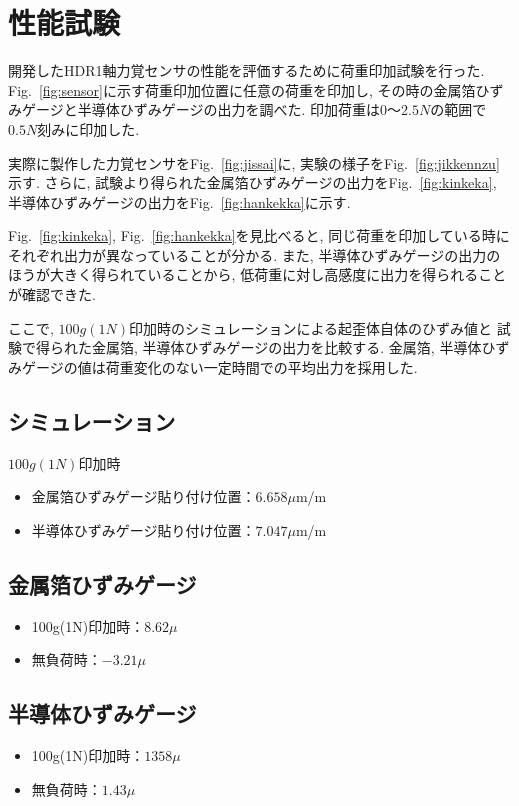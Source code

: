 \section{性能試験}
開発したHDR1軸力覚センサの性能を評価するために荷重印加試験を行った.
Fig.~\ref{fig:sensor}に示す荷重印加位置に任意の荷重を印加し, 
その時の金属箔ひずみゲージと半導体ひずみゲージの出力を調べた. 
印加荷重は$0～2.5N$の範囲で$0.5N$刻みに印加した.

実際に製作した力覚センサをFig.~\ref{fig:jissai}に, 
実験の様子をFig.~\ref{fig:jikkennzu}示す.
さらに, 試験より得られた金属箔ひずみゲージの出力をFig.~\ref{fig:kinkeka}, 
半導体ひずみゲージの出力をFig.~\ref{fig:hankekka}に示す. 

Fig.~\ref{fig:kinkeka}, Fig.~\ref{fig:hankekka}を見比べると, 
同じ荷重を印加している時にそれぞれ出力が異なっていることが分かる. 
また, 半導体ひずみゲージの出力のほうが大きく得られていることから, 
低荷重に対し高感度に出力を得られることが確認できた. 

ここで, $100g(1N)$印加時のシミュレーションによる起歪体自体のひずみ値と 
試験で得られた金属箔, 半導体ひずみゲージの出力を比較する. 
金属箔, 半導体ひずみゲージの値は荷重変化のない一定時間での平均出力を採用した. 
\vspace{0.3cm}
\subsection*{シミュレーション}
$100g(1N)$印加時
\begin{itemize}
  \item 金属箔ひずみゲージ貼り付け位置：$6.658\mu$m/m
  \item 半導体ひずみゲージ貼り付け位置：$7.047\mu$m/m
\end{itemize}
\vspace{0.3cm}
\subsection*{金属箔ひずみゲージ}
\begin{itemize}
  \item 100g(1N)印加時：$8.62\mu$
  \item 無負荷時：$-3.21\mu$
\end{itemize}
\vspace{0.3cm}
\subsection*{半導体ひずみゲージ}
\begin{itemize}
  \item 100g(1N)印加時：$1358\mu$
  \item 無負荷時：$1.43\mu$
\end{itemize}
\vspace{0.3cm}

